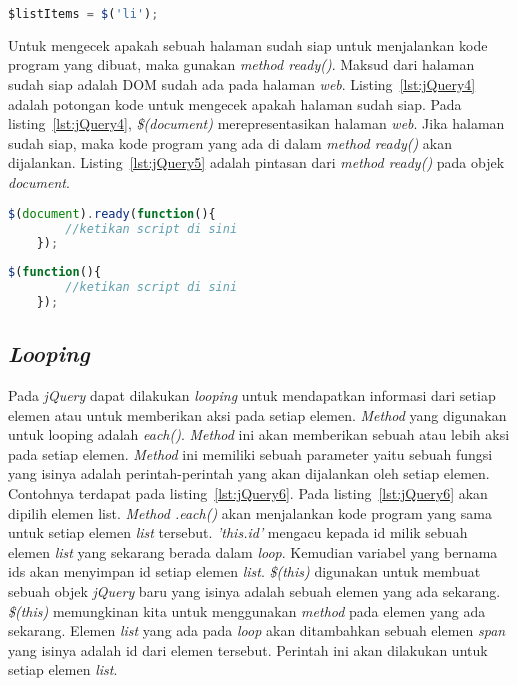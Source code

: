 \begin{lstlisting}[language=Javascript, caption=Menyimpan objek jQuery , label={lst:jQuery3}]
	$listItems = $('li');
\end{lstlisting}

Untuk mengecek apakah sebuah halaman sudah siap untuk menjalankan kode program yang dibuat, maka gunakan \textit{method ready()}. Maksud dari halaman sudah siap adalah DOM sudah ada pada halaman \textit{web}. Listing~\ref{lst:jQuery4} adalah potongan kode untuk mengecek apakah halaman sudah siap. Pada listing~\ref{lst:jQuery4}, \textit{\$(document)} merepresentasikan halaman \textit{web}. Jika halaman sudah siap, maka kode program yang ada di dalam \textit{method ready()} akan dijalankan. Listing~\ref{lst:jQuery5} adalah pintasan dari \textit{method ready()} pada objek \textit{document}.

\begin{lstlisting}[language=Javascript, caption=Mengecek apakah halaman sudah siap , label={lst:jQuery4}]
	$(document).ready(function(){
		//ketikan script di sini
	});
\end{lstlisting}

\begin{lstlisting}[language=Javascript, caption=Pintasan dari method \$(document).ready() , label={lst:jQuery5}]
	$(function(){
		//ketikan script di sini
	});
\end{lstlisting}

\subsection{\textit{Looping}}
Pada \textit{jQuery} dapat dilakukan \textit{looping} untuk mendapatkan informasi dari setiap elemen atau untuk memberikan aksi pada setiap elemen. \textit{Method} yang digunakan untuk looping adalah \textit{each()}. \textit{Method} ini akan memberikan sebuah atau lebih aksi pada setiap elemen. \textit{Method} ini memiliki sebuah parameter yaitu sebuah fungsi yang isinya adalah perintah-perintah yang akan dijalankan oleh setiap elemen. Contohnya terdapat pada listing~\ref{lst:jQuery6}. Pada listing~\ref{lst:jQuery6} akan dipilih elemen list. \textit{Method .each()} akan menjalankan kode program yang sama untuk setiap elemen \textit{list} tersebut. \textit{'this.id'} mengacu kepada id milik sebuah elemen \textit{list} yang sekarang berada dalam \textit{loop}. Kemudian variabel yang bernama ids akan menyimpan id setiap elemen \textit{list}. \textit{\$(this)} digunakan untuk membuat sebuah objek \textit{jQuery} baru yang isinya adalah sebuah elemen yang ada sekarang. \textit{\$(this)} memungkinan kita untuk menggunakan \textit{method} pada elemen yang ada sekarang. Elemen \textit{list} yang ada pada \textit{loop} akan ditambahkan sebuah elemen \textit{span} yang isinya adalah id dari elemen tersebut. Perintah ini akan dilakukan untuk setiap elemen \textit{list}.

